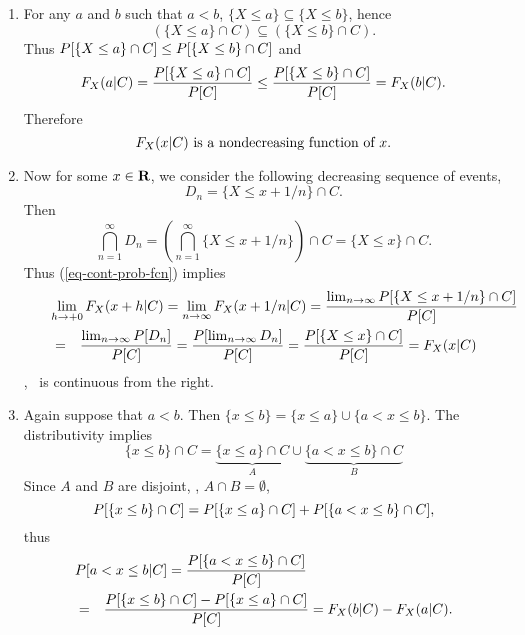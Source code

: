 \begin{enumerate}
\begin{solution}
\begin{enumerate}
		\item
		For any $a$ and $b$ such that $a<b$,
		$\{X\leq a\} \subseteq \{X\leq b\}$,
		hence
		\[
			\left( \{X\leq a\} \cap C \right) \subseteq
			\left( \{X\leq b\} \cap C \right).
		\]
		Thus $ P[ \{X\leq a\} \cap C ] \leq P[ \{X\leq b\} \cap C ]$
		and
		\[
		F_{X}(a|C)
		=\frac{P[ \{X\leq a\} \cap C ]}{P[C]} \leq
		\frac{ P[ \{X\leq b\} \cap C ]}{P[C]}
		=F_{X}(b|C).
		\]
		Therefore
		\begin{equation}
		\label{eq-4}
		F_{X}(x|C) \mbox{ is a nondecreasing function of } x.
		\end{equation}

		\item
		Now for some $x\in{\mbox{\bf R}}$,
		we consider the following decreasing sequence of events,
		\[
			D_n = \{X\leq x + 1/n \} \cap C.
		\]
		Then
		\[
			\bigcap_{n=1}^\infty D_n
			= \left( \bigcap_{n=1}^\infty \{ X \leq x + 1/n \} \right) \cap C
			= \{X\leq x\} \cap C.
		\]
		Thus (\ref{eq-cont-prob-fcn}) implies
		\begin{eqnarray}
			\nonumber
			\lefteqn{
			\lim_{h\to+0} \ccdfxk{x+h}{C}
			= \lim_{n\to\infty} \ccdfxk{x+1/n}{C}
			= \frac{ \lim_{n\to\infty} \pr{ \{X \leq x + 1/n\} \cap C }}{\pr{C}}
			}
			\\
			&=& \frac{ \lim_{n\to\infty} \pr{ D_n }}{\pr{C}}
			= \frac{ \pr{ \lim_{n\to\infty} D_n }}{\pr{C}}
			= \frac{ \pr{ \{X\leq x\} \cap C }}{\pr{C}}
			= \ccdfxk{x}{C}
			\label{eq-5}
		\end{eqnarray}
		\ie,
		\
		is continuous from the right.


		\item
		Again suppose that $a<b$.
		Then $\{x\leq b\} = \{x\leq a\} \cup  \{ a < x \leq b\}$.
		The distributivity implies
		\[
			\{x\leq b\} \cap C
			= \underbrace{\{x\leq a\} \cap C}_A
			\cup  \underbrace{\{ a < x \leq b\} \cap C}_B
		\]
		Since $A$ and $B$ are disjoint, \ie, $A\cap B = \emptyset$,
		\[
			P[\{x\leq b\} \cap C]
			= P[\{x\leq a\} \cap C]
			+  P[\{ a < x \leq b\} \cap C],
		\]
		thus
		\begin{eqnarray}
		\nonumber
			\lefteqn{
			\cpr{a<x\leq b}{C}
			= \frac{\pr{\{a<x\leq b\}\cap C }}{\pr{C}}
			}
			\\
			&=&
			 \frac{\pr{\{x\leq b\} \cap C} - \pr{\{x\leq a\} \cap C}}{\pr{C}}
			= \ccdfxk{b}{C} - \ccdfxk{a}{C}.
			\label{eq-6}
		\end{eqnarray}


\end{enumerate}
\end{solution}
\end{enumerate}
